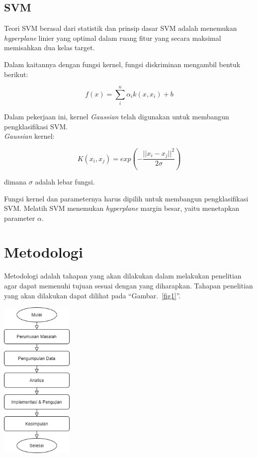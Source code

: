 \documentclass[conference]{IEEEtran}
\begin{document}
\subsection{SVM}

Teori SVM berasal dari statistik dan prinsip dasar SVM adalah menemukan \emph{hyperplane} linier yang optimal dalam ruang fitur yang secara maksimal memisahkan dua kelas target\cite{hasan}.

Dalam kaitannya dengan fungsi kernel, fungsi diskriminan mengambil bentuk berikut:

\begin{equation}
f(x) = \sum^{n}_i \alpha_ik(x,x_i)+b
\label{eq4}
\end{equation}

Dalam pekerjaan ini, kernel \emph{Gaussian} telah digunakan
untuk membangun pengklasifikasi SVM.\\ \emph{Gaussian} kernel:

\begin{equation}
K(x_i,x_j) = exp\left (- \frac{||x_i-x_j||^2}{2\sigma} \right )
\label{eq5}
\end{equation}

\noindent dimana $\sigma$ adalah lebar fungsi.

Fungsi kernel dan parameternya harus dipilih untuk 
membangun pengklasifikasi SVM. Melatih SVM menemukan \emph{hyperplane} margin besar, yaitu menetapkan parameter $\alpha$.\\

\section{Metodologi}

Metodologi adalah tahapan yang akan dilakukan dalam melakukan penelitian agar dapat memenuhi tujuan sesuai dengan yang diharapkan. Tahapan penelitian yang akan dilakukan dapat dilihat pada ``Gambar.~\ref{fig1}''.\\

\begin{minipage}{\linewidth}
\centerline{\includegraphics[width=35mm]{Gambar/Metodologi_Diagram.png}}
\label{fig1}
\end{minipage}
\end{document}
